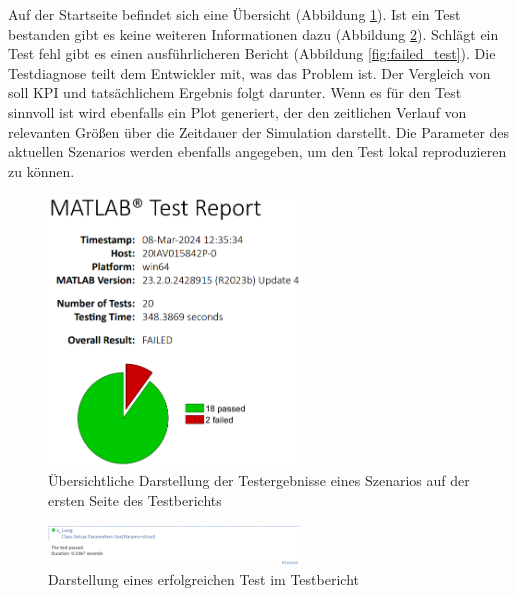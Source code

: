 Auf der Startseite befindet sich eine Übersicht (Abbildung \ref{fig:testreport_aufmacher}). Ist ein Test bestanden gibt es keine weiteren Informationen dazu (Abbildung \ref{fig:successfull_test}). Schlägt ein Test fehl gibt es einen ausführlicheren Bericht (Abbildung \ref{fig:failed_test}). Die Testdiagnose teilt dem Entwickler mit, was das Problem ist. Der Vergleich von soll KPI und tatsächlichem Ergebnis folgt darunter. Wenn es für den Test sinnvoll ist wird ebenfalls ein Plot generiert, der den zeitlichen Verlauf von relevanten Größen über die Zeitdauer der Simulation darstellt. Die Parameter des aktuellen Szenarios werden ebenfalls angegeben, um den Test lokal reproduzieren zu können.
\begin{figure}
    \centering
    \includegraphics[width=0.6\textwidth]{figures/3_Implementierung/testreport_aufmacher.png}
    \caption{Übersichtliche Darstellung der Testergebnisse eines Szenarios auf der ersten Seite des Testberichts}
    \label{fig:testreport_aufmacher}
\end{figure}
\begin{figure}
    \centering
    \includegraphics[width=0.6\textwidth]{figures/3_Implementierung/successfull_test.png}
    \caption{Darstellung eines erfolgreichen Test im Testbericht}
    \label{fig:successfull_test}
\end{figure}
